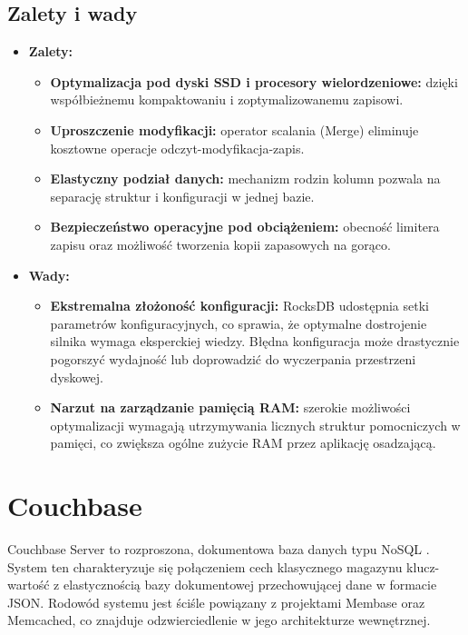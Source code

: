 \subsection{Zalety i wady}
\begin{itemize}
    \item \textbf{Zalety:}
    \begin{itemize}
        \item \textbf{Optymalizacja pod dyski SSD i procesory wielordzeniowe:} dzięki współbieżnemu kompaktowaniu i zoptymalizowanemu zapisowi.
        \item \textbf{Uproszczenie modyfikacji:} operator scalania (Merge) eliminuje kosztowne operacje odczyt-modyfikacja-zapis.
        \item \textbf{Elastyczny podział danych:} mechanizm rodzin kolumn pozwala na separację struktur i konfiguracji w jednej bazie.
        \item \textbf{Bezpieczeństwo operacyjne pod obciążeniem:} obecność limitera zapisu oraz możliwość tworzenia kopii zapasowych na gorąco.
    \end{itemize}
    \item \textbf{Wady:}
    \begin{itemize}
        \item \textbf{Ekstremalna złożoność konfiguracji:} RocksDB udostępnia setki parametrów konfiguracyjnych, co sprawia, że optymalne dostrojenie silnika wymaga eksperckiej wiedzy. Błędna konfiguracja może drastycznie pogorszyć wydajność lub doprowadzić do wyczerpania przestrzeni dyskowej.
        \item \textbf{Narzut na zarządzanie pamięcią RAM:} szerokie możliwości optymalizacji wymagają utrzymywania licznych struktur pomocniczych w pamięci, co zwiększa ogólne zużycie RAM przez aplikację osadzającą.
    \end{itemize}
\end{itemize}

\section{Couchbase}
Couchbase Server to rozproszona, dokumentowa baza danych typu NoSQL \cite{couchbase2023}. System ten charakteryzuje się połączeniem cech klasycznego magazynu klucz-wartość z elastycznością bazy dokumentowej przechowującej dane w formacie JSON. Rodowód systemu jest ściśle powiązany z projektami Membase oraz Memcached, co znajduje odzwierciedlenie w jego architekturze wewnętrznej.

